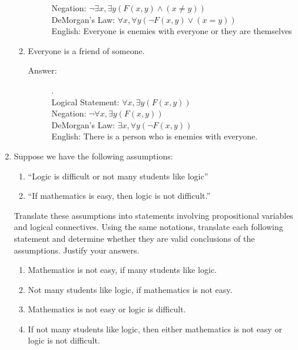 \documentclass[12pt, oneside]{article}
\begin{document}
\begin{enumerate}
\begin{enumerate}
\begin{description}
        Negation: $\lnot \exists x, \exists y (F(x,y) \land (x \neq y))$\\
        DeMorgan's Law: $\forall x, \forall y (\lnot F(x,y) \lor (x=y))$\\
        English: Everyone is enemies with everyone or they are themselves
    \end{description}
    \item Everyone is a friend of someone.
    \begin{description}
        \item[Answer:] .\\
        Logical Statement: $\forall x, \exists y(F(x,y))$\\
        Negation: $\lnot \forall x, \exists y(F(x,y))$\\
        DeMorgan's Law: $\exists x, \forall y(\lnot F(x,y))$\\
        English: There is a person who is enemies with everyone.
    \end{description}
\end{enumerate}





\item Suppose we have the following assumptions:

\begin{enumerate}
    \item ``Logic is difficult or not many students like logic''
    \item ``If mathematics is easy, then logic is not difficult.''
\end{enumerate}


Translate these assumptions into statements involving propositional variables and logical connectives. Using the same notations, translate each following statement and determine whether they are valid conclusions of the assumptions. Justify your answers.

\begin{enumerate}[label=(\roman*)]
    \item Mathematics is not easy, if many students like logic.
    \item Not many students like logic, if mathematics is not easy.
    \item Mathematics is not easy or logic is difficult.
    \item If not many students like logic, then either mathematics is not easy or logic is not difficult.\\
        

\end{enumerate}
\end{enumerate}
\end{document}
